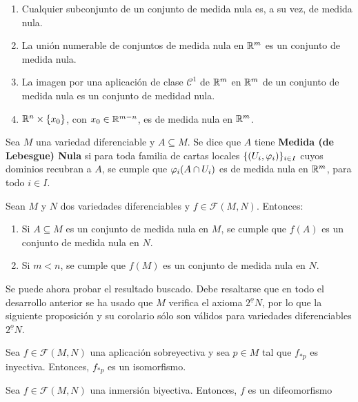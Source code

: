 \documentclass[Cursovd_portada.tex]{subfiles}
\begin{document}
\begin{enumerate}
\item Cualquier subconjunto de un conjunto de medida nula es, a su
vez, de medida nula. \item La unión numerable de conjuntos de
medida nula en $\mathbb{R}^m$ es un conjunto de medida nula. \item La
imagen por una aplicación de clase $\mathcal{C}^1$ de $\mathbb{R}^m$
en $\mathbb{R}^m$ de un conjunto de medida nula es un conjunto de medidad
nula. \item $\mathbb{R}^n\times\{x_0\}$, con $x_0\in\mathbb{R}^{m-n}$, es de
medida nula en $\mathbb{R}^m$.
\end{enumerate}
\begin{defi}
Sea $M$ una variedad diferenciable y $A\subseteq M$. Se dice que
$A$ tiene {\bf Medida (de Lebesgue) Nula} si para toda familia de
cartas locales $\{(U_i,\varphi_i)\}_{i\in I}$ cuyos dominios recubran
a $A$, se cumple que $\varphi_i(A\cap U_i)$ es de medida nula en
$\mathbb{R}^m$, para todo $i\in I$.
\end{defi}
\begin{prop}
Sean $M$ y $N$ dos variedades diferenciables y
$f\in\mathcal{F}(M,N)$. Entonces:
\begin{enumerate}
\item Si $A\subseteq M$ es un conjunto de medida nula en $M$, se
cumple que $f(A)$ es un conjunto de medida nula en $N$. \item Si
$m<n$, se cumple que $f(M)$ es un conjunto de medida nula en $N$.
\end{enumerate}
\end{prop}
\hs Se puede ahora probar el resultado buscado. Debe resaltarse
que en todo el desarrollo anterior se ha usado que $M$ verifica el
axioma $2^{\underline{o}}N$, por lo que la si\-guien\-te
proposición y su corolario sólo son válidos para
variedades diferenciables $2^{\underline{o}}N$.
\begin{prop}
Sea $f\in\mathcal{F}(M,N)$ una aplicación sobreyectiva y sea
$p\in M$ tal que $f_{*p}$ es inyectiva. Entonces, $f_{*p}$ es un
isomorfismo.
\end{prop}
\begin{coro}
Sea $f\in\mathcal{F}(M,N)$ una inmersión biyectiva. Entonces,
$f$ es un difeomorfismo
\end{coro}
\end{document}
